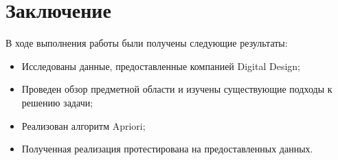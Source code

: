 \documentclass[14pt]{matmex-diploma-custom}
\begin{document}
\section*{Заключение}
В ходе выполнения работы были получены следующие результаты:
\begin{itemize}
    \item Исследованы данные, предоставленные компанией Digital Design;
    \item Проведен обзор предметной области и изучены существующие подходы к решению задачи;
    \item Реализован алгоритм Apriori;
    \item Полученная реализация протестирована на предоставленных данных.
\end{itemize}

\setmonofont[Mapping=tex-text]{CMU Typewriter Text}


\end{document}
